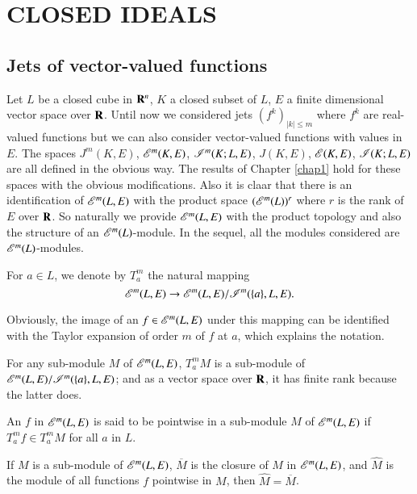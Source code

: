 \chapter{CLOSED IDEALS}\label{chap2}

\section{Jets of vector-valued functions}\label{chap2-sec1}

Let $L$ be a closed cube in $\mathbf{R}^{n}$, $K$ a closed subset of $L$, $E$ a finite dimensional vector space over $\mathbf{R}$. Until now we considered jets $(f^{k})_{|k|\leq m}$ where $f^{k}$ are real-valued functions but we can also consider vector-valued functions with values in $E$. The spaces $J^{m}(K,E)$, $\mathscr{E}^{m}(K,E)$, $\mathscr{I}^{m}(K;L,E)$, $J(K,E)$, $\mathscr{E}(K,E)$, $\mathscr{I}(K;L,E)$ are all defined in the obvious way. The results of Chapter \ref{chap1} hold for these spaces with the obvious modifications. Also it is claar that there is an identification of $\mathscr{E}^{m}(L,E)$ with the product space $(\mathscr{E}^{m}(L))^{r}$ where $r$ is the rank of $E$ over $\mathbf{R}$. So naturally we provide $\mathscr{E}^{m}(L,E)$ with the product topology and also the structure of an $\mathscr{E}^{m}(L)$-module. In the sequel, all the modules considered are $\mathscr{E}^{m}(L)$-modules.

\begin{definition}\label{chap2-defi1.1}
For $a\in L$, we denote by $T^{m}_{a}$ the natural mapping
$$
\mathscr{E}^{m}(L,E)\to \mathscr{E}^{m}(L,E)/\mathscr{I}^{m}(\{a\},L,E).
$$

Obviously, the image of an $f\in \mathscr{E}^{m}(L,E)$ under this mapping can be identified with the Taylor expansion of order $m$ of $f$ at $a$, which explains the notation.

For any sub-module $M$ of $\mathscr{E}^{m}(L,E)$, $T^{m}_{a}M$ is a sub-module of $\mathscr{E}^{m}(L,E)/\mathscr{I}^{m}(\{a\},L,E)$; and as a vector space over $\mathbf{R}$, it has finite rank because the latter does.
\end{definition}

\begin{definition}\label{chap2-defi1.2}
An $f$ in $\mathscr{E}^{m}(L,E)$ is said to be pointwise in a sub-module $M$ of $\mathscr{E}^{m}(L,E)$ if $T^{m}_{a}f\in T^{m}_{a}M$ for all $a$ in $L$.
\end{definition}

\begin{theorem}[Whitney {[2].}]\label{chap2-thm1.3}
If $M$ is a sub-module of $\mathscr{E}^{m}(L,E)$, $\overline{M}$ is the closure of $M$ in $\mathscr{E}^{m}(L,E)$, and $\widehat{M}$ is the module of all functions $f$ pointwise in $M$, then $\widehat{M}=\overline{M}$.
\end{theorem}

